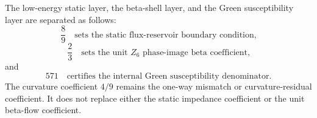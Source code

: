 \begin{corollary}
\label{cor:zeckendorf-coefficient-layer-separation}
The low-energy static layer, the beta-shell layer, and the Green
susceptibility layer are separated as follows:
$$
  \frac89
  \quad\text{sets the static flux-reservoir boundary condition,}
$$
$$
  \frac23
  \quad\text{sets the unit }Z_6\text{ phase-image beta coefficient,}
$$
and
$$
  571
  \quad\text{certifies the internal Green susceptibility denominator.}
$$
The curvature coefficient $4/9$ remains the one-way mismatch or
curvature-residual coefficient. It does not replace either the static
impedance coefficient or the unit beta-flow coefficient.
\end{corollary}
